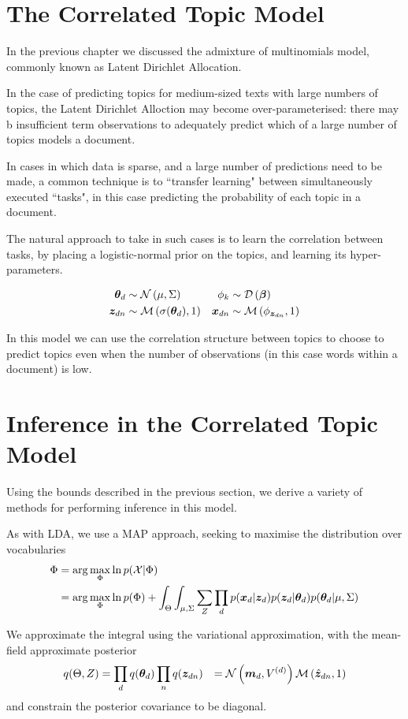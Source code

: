 \section{The Correlated Topic Model}
In the previous chapter we discussed the admixture of multinomials model, commonly known as Latent Dirichlet Allocation.

In the case of predicting topics for medium-sized texts with large numbers of topics, the Latent Dirichlet Alloction may become over-parameterised: there may b insufficient term observations to adequately predict which of a large number of topics models a document.

In cases in which data is sparse, and a large number of predictions need to be made, a common technique is to ``transfer learning" between simultaneously executed ``tasks"\cite{Caruana1997}, in this case predicting the probability of each topic in a document.

The natural approach to take in such cases is to learn the correlation between tasks, by placing a logistic-normal prior on the topics, and learning its hyper-parameters.

\begin{align}
{  \bm \theta _d } &\sim \mathcal{N} \left( {\mu}, {\Sigma} \right) &
\phi_k &\sim \mathcal{D} \left( {\bm \beta} \right) \\
{ \bm z_{dn} } &\sim \mathcal{M} \left( {\sigma({ \bm \theta_d })},{1} \right) &
\bm x_{dn} &\sim \mathcal{M} \left( {\phi_{{ \bm z_{dn} }}},{1} \right)
\end{align}

In this model we can use the correlation structure between topics to choose to predict topics even when the number of observations (in this case words within a document) is low. 

\section{Inference in the Correlated Topic Model}
Using the bounds described in the previous section, we derive a variety of methods for performing inference in this model.

As with LDA, we use a MAP approach, seeking to maximise the distribution over vocabularies 
\begin{align}
\Phi & = \arg \max_\Phi \ln p({ \mathcal{X} } | \Phi) \\
     & = \arg \max_\Phi \ln p(\Phi) + \int_\Theta \int_{\mu,\Sigma} \sum_Z \prod_d p({ \bm x_d }|\bm z_d)p(\bm z_d | { \bm \theta_d })p({ \bm \theta_d }|\mu, \Sigma)
\end{align}

We approximate the integral using the variational approximation, with the mean-field approximate posterior 
\begin{align}
q(\Theta,Z) & = \prod_d q({ \bm \theta_d })\prod_n q({ \bm z_{dn} })
 &= \mathcal{N} \left( {\bm m_d}, {V^{(d)}} \right) \mathcal{M} \left( {\hat{\bm z}_{dn}},{1} \right)
\end{align}
and constrain the posterior covariance to be diagonal.

